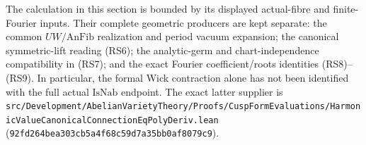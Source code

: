 The calculation in this section is bounded by its displayed
actual-fibre and finite-Fourier inputs.
Their complete geometric producers are kept separate:
the common \(UW/\mathrm{AnFib}\) realization and period
vacuum expansion; the canonical symmetric-lift reading
(RS6); the analytic-germ and chart-independence
compatibility in (RS7); and the exact Fourier
coefficient/roots identities (RS8)--(RS9).
In particular, the formal Wick contraction alone has
not been identified with the full actual
\(\mathrm{IsNab}\) endpoint.
The exact latter supplier is
\texttt{src/Development/AbelianVarietyTheory/Proofs/CuspFormEvaluations/HarmonicValueCanonicalConnectionEqPolyDeriv.lean}
(\texttt{92fd264bea303cb5a4f68c59d7a35bb0af8079c9}).
